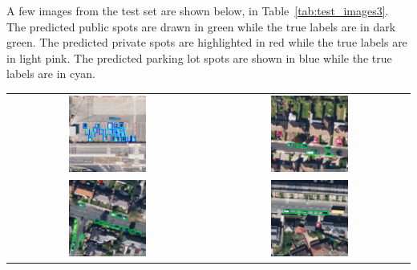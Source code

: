 A few images from the test set are shown below, in Table~\ref{tab:test_images3}.
The predicted public spots are drawn in green while the true labels are in dark green. The predicted private spots are highlighted in red while the true labels are in light pink. The predicted parking lot spots are shown in blue while the true labels are in cyan.

\begin{table}[htbp]
    \centering
    \begin{tabular}{cc}
        \includegraphics[width=0.4\textwidth]{images/image1_classification_test_set.png} & \includegraphics[width=0.4\textwidth]{images/image2_classification_test_set.png} \\
        \includegraphics[width=0.4\textwidth]{images/image3_classification_test_set.png} & \includegraphics[width=0.4\textwidth]{images/image4_classification_test_set.png} \\

\end{tabular}
\end{table}
